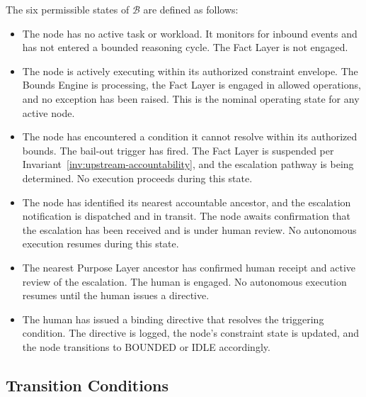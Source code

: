 \begin{definition}
\label{def:bailout-states}
The six permissible states of $\mathcal{B}$ are defined as follows:

\begin{itemize}[noitemsep]
\item[\textbf{IDLE:}] The node has no active task or workload. It monitors for inbound events and has not entered a bounded reasoning cycle. The Fact Layer is not engaged.

\item[\textbf{BOUNDED:}] The node is actively executing within its authorized constraint envelope. The Bounds Engine is processing, the Fact Layer is engaged in allowed operations, and no exception has been raised. This is the nominal operating state for any active node.

\item[\textbf{BAIL\_PENDING:}] The node has encountered a condition it cannot resolve within its authorized bounds. The bail-out trigger has fired. The Fact Layer is suspended per Invariant~\ref{inv:upstream-accountability}, and the escalation pathway is being determined. No execution proceeds during this state.

\item[\textbf{ESCALATING:}] The node has identified its nearest accountable ancestor, and the escalation notification is dispatched and in transit. The node awaits confirmation that the escalation has been received and is under human review. No autonomous execution resumes during this state.

\item[\textbf{HUMAN\_ACKNOWLEDGED:}] The nearest Purpose Layer ancestor has confirmed human receipt and active review of the escalation. The human is engaged. No autonomous execution resumes until the human issues a directive.

\item[\textbf{RESOLVED:}] The human has issued a binding directive that resolves the triggering condition. The directive is logged, the node's constraint state is updated, and the node transitions to BOUNDED or IDLE accordingly.
\end{itemize}
\end{definition}

\subsection{Transition Conditions}
\label{sec:bailout-transitions}

